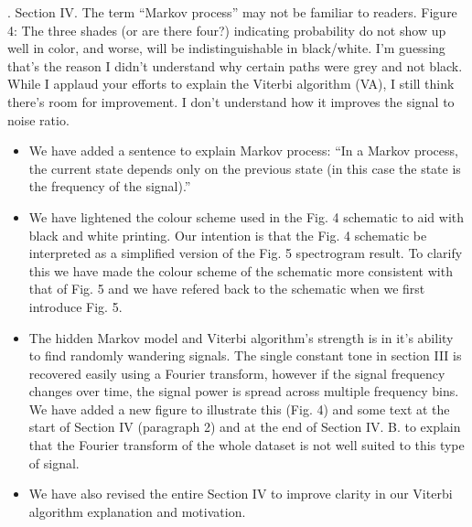 \documentclass{article}
\begin{document}
. Section IV.  The term “Markov process” may not be familiar to readers.  Figure 4: The three shades (or are there four?) indicating probability do not show up well in color, and worse, will be indistinguishable in black/white.  I’m guessing that’s the reason I didn’t understand why certain paths were grey and not black.  While I applaud your efforts to explain the Viterbi algorithm (VA), I still think there’s room for improvement.  I don’t understand how it improves the signal to noise ratio. 
\begin{itemize}
\item We have added a sentence to explain Markov process: ``In a Markov process, the current state depends only on the previous state (in this case the state is the frequency of the signal).''
\item We have lightened the colour scheme used in the Fig. 4 schematic to aid with black and white printing. Our intention is that the Fig. 4 schematic be interpreted as a simplified version of the Fig. 5 spectrogram result. To clarify this we have made the colour scheme of the schematic more consistent with that of Fig. 5 and we have refered back to the schematic when we first introduce Fig. 5. 
\item The hidden Markov model and Viterbi algorithm's strength is in it's ability to find randomly wandering signals. The single constant tone in section III is recovered easily using a Fourier transform, however if the signal frequency changes over time, the signal power is spread across multiple frequency bins. We have added a new figure to illustrate this (Fig. 4) and some text at the start of Section IV (paragraph 2) and at the end of Section IV. B. to explain that the Fourier transform of the whole dataset is not well suited to this type of signal.
\item We have also revised the entire Section IV to improve clarity in our Viterbi algorithm explanation and motivation.
\end{itemize}
\end{document}
